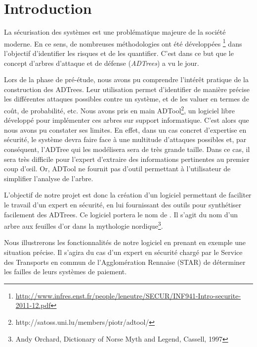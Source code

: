 \section{Introduction}
	
	La sécurisation des systèmes est une problématique majeure de la société moderne. En ce sens, de nombreuses méthodologies ont été développées \footnote{\url{http://www.infres.enst.fr/people/leneutre/SECUR/INF941-Intro-securite-2011-12.pdf}} dans l'objectif d'identifier les risques et de les quantifier. C'est dans ce but que le concept d'arbres d'attaque et de défense (\emph{ADTrees}) a vu le jour.
	
	Lors de la phase de pré-étude, nous avons pu comprendre l’intérêt pratique de la construction des ADTrees. Leur utilisation permet d'identifier de manière précise les différentes attaques possibles contre un système, et de les valuer en termes de coût, de probabilité, etc. Nous avons pris en main ADTool\footnote{http://satoss.uni.lu/members/piotr/adtool/}, un logiciel libre développé pour implémenter ces arbres sur support informatique. C'est alors que nous avons pu constater ses limites. En effet, dans un cas concret d'expertise en sécurité, le système devra faire face à une multitude d'attaques possibles et, par conséquent, l'ADTree qui les modélisera sera de très grande taille. Dans ce cas, il sera très difficile pour l'expert d'extraire des informations pertinentes au premier coup d’œil. Or, ADTool ne fournit pas d'outil permettant à l'utilisateur de simplifier l'analyse de l'arbre. 

	L'objectif de notre projet est donc la création d'un logiciel permettant de faciliter le travail d'un expert en sécurité, en lui fournissant des outils pour synthétiser facilement des ADTrees. Ce logiciel portera le nom de \glasir. Il s'agit du nom d'un arbre aux feuilles d'or dans la mythologie nordique\footnote{Andy Orchard, Dictionary of Norse Myth and Legend, Cassell, 1997}.

	Nous illustrerons les fonctionnalités de notre logiciel en prenant en exemple une situation précise. Il s'agira du cas d'un expert en sécurité chargé par le Service des Transports en commun de l'Agglomération Rennaise (STAR) de déterminer les failles de leurs systèmes de paiement.













